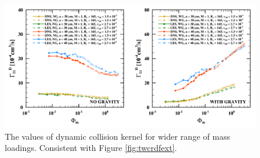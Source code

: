 
\begin{figure}[h]
\centering
\includegraphics[width=13.5cm]{figures/2-13_twcgammaext.pdf}
\caption{
The values of dynamic collision kernel for wider range of mass loadings.
Consistent with Figure \ref{fig:twcrdfext}.
}
\label{fig:twcgammaext}
\end{figure}
    

